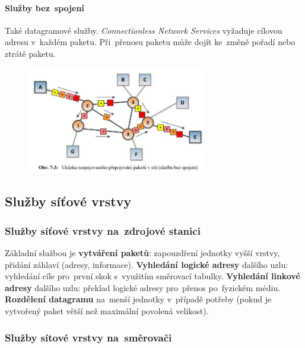 \paragraph{Služby bez~spojení} Také datagramové služby. \emph{Connectionless Network Services} vyžaduje cílovou adresu v~každém paketu. Při~přenosu paketu může dojít ke~změně pořadí nebo ztrátě paketu.

\begin{figure}[ht]
	\centering
	\includegraphics[width=0.7\textwidth]{images/q07_connectionless}
\end{figure}


\subsection{Služby síťové vrstvy}

\subsubsection{Služby síťové vrstvy na~zdrojové stanici}

Základní službou je \textbf{vytváření paketů}: zapouzdření jednotky vyšší vrstvy, přidání záhlaví (adresy, informace). \textbf{Vyhledání logické adresy} dalšího uzlu: vyhledání cíle pro~první skok s~využitím směrovací tabulky. \textbf{Vyhledání linkové adresy} dalšího uzlu: překlad logické adresy pro~přenos po~fyzickém médiu. \textbf{Rozdělení datagramu} na~menší jednotky v~případě potřeby (pokud je vytvořený paket větší než maximální povolená velikost).

\subsubsection{Služby sítové vrstvy na~směrovači}

